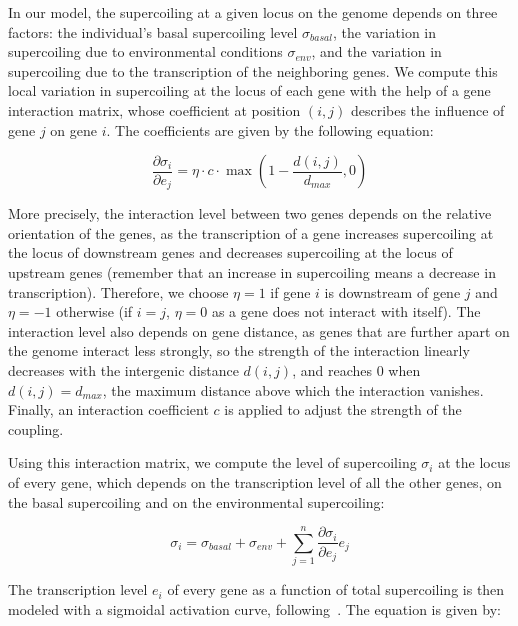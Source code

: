 In our model, the supercoiling at a given locus on the genome depends on three factors: the individual's basal supercoiling level $\sigma_{basal}$, the variation in supercoiling due to environmental conditions $\sigma_{env}$, and the variation in supercoiling due to the transcription of the neighboring genes.
We compute this local variation in supercoiling at the locus of each gene with the help of a gene interaction matrix, whose coefficient at position $(i, j)$ describes the influence of gene $j$ on gene $i$.
The coefficients are given by the following equation:

\begin{equation}
\frac{\partial\sigma_{i}}{\partial e_j} = \eta\cdot c \cdot\max(1-\frac{d(i, j)}{d_{max}}, 0)
\label{eq:dsde}
\end{equation}

More precisely, the interaction level between two genes depends on the relative orientation of the genes, as the transcription of a gene increases supercoiling at the locus of downstream genes and decreases supercoiling at the locus of upstream genes (remember that an increase in supercoiling means a decrease in transcription).
Therefore, we choose $\eta = 1$ if gene $i$ is downstream of gene $j$ and $\eta = -1$ otherwise (if $i=j$, $\eta = 0$ as a gene does not interact with itself).
The interaction level also depends on gene distance, as genes that are further apart on the genome interact less strongly, so the strength of the interaction linearly decreases with the intergenic distance $d(i, j)$, and reaches 0 when $d(i, j) = d_{max}$, the maximum distance above which the interaction vanishes.
Finally, an interaction coefficient $c$ is applied to adjust the strength of the coupling.

Using this interaction matrix, we compute the level of supercoiling $\sigma_i$ at the locus of every gene, which depends on the transcription level of all the other genes, on the basal supercoiling and on the environmental supercoiling:

\begin{equation}
  \sigma_i = \sigma_{basal} + \sigma_{env} + \sum_{j=1}^n\frac{\partial\sigma_{i}}{\partial e_j}e_j
  \label{eq:alife_sigma}
\end{equation}

The transcription level $e_i$ of every gene as a function of total supercoiling is then modeled with a sigmoidal activation curve, following~\cite{elhoudaigui2019}.
The equation is given by:

